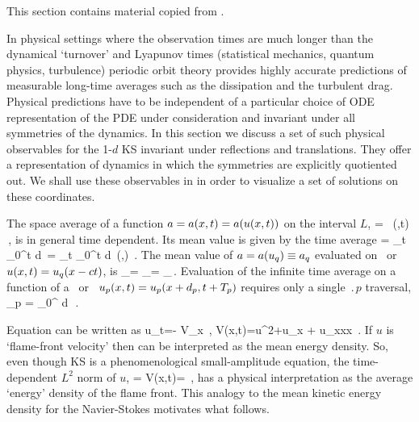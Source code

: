 \ifboyscout
This section contains material copied from .
\fi

In physical settings where the observation times are much
longer than the dynamical `turnover' and Lyapunov times
(statistical mechanics, quantum physics, turbulence) periodic
orbit theory provides highly accurate predictions
of measurable long-time averages such as the dissipation and
the turbulent drag. Physical predictions have to
be independent of a particular choice of ODE representation
of the PDE under consideration and
invariant under all symmetries of the dynamics. In this
section we discuss a set of such physical observables for the
1-$d$ KS invariant under reflections and translations. They
offer a representation of dynamics in which the symmetries
are explicitly quotiented out. We shall use these
observables in  in order to
visualize a set of solutions on these coordinates.

The {space average} of a function
$a = a(x,t) = a(u(x,t))$
on the interval $L$,
\beq
    \expct{\obser} = \Lint{\pSpace}\, \obser(\pSpace,t)
    \,,
    \label{rpo:spac_ave}
\eeq
is in general time dependent.
Its mean value is given by the {time average}
\beq
\timeAver{\obser}
    =
\lim_{t\rightarrow \infty}  \int_0^t \! d\tau \, \expct{\obser}
    =
\lim_{t\rightarrow \infty}  \int_0^t \!
    \Lint{\tau}  d\pSpace\, \obser(\pSpace,\tau)
    \,.
\label{rpo:tim_ave}
\eeq
The mean value of $a = a(u_q) \equiv a_q$ evaluated on
\eqv\ or {\reqv} $u(x,t) = u_q(x-ct)$,
is
\beq
\timeAver{\obser}_\stagn = \expct{\obser}_\stagn = \obser_\stagn\,.
\label{rpo:u-eqv} \eeq
Evaluation of the infinite time average
 on a function of a \po\ or \rpo\
$u_p(x,t)=u_p(x+d_p,t+{T_{p}})$ requires only a single
$\period{p}$ traversal,
\beq
  \timeAver{\obser}_p = 
    \int_0^{\period{p}} \! d\tau \, \expct{\obser}
\,.
\label{rpo:u-cyc}
\eeq

Equation  can be written as
\beq
    u_t=- V_x
        \,,\qquad
    V(x,t)={\textstyle{}}u^2+u_{x} + u_{xxx}
    \,.
If $u$ is `flame-front velocity' then
can be interpreted as the mean energy
density. So, even though KS is a phenomenological
small-amplitude equation, the time-dependent $L^2$ norm
of $u$,
\beq
    \expctE=
  \Lint{\pSpace}
  V(x,t)=
  \Lint{\pSpace} 
  \,,
  \label{ksEnergy}
\eeq
has a physical interpretation as the average `energy'
density of the flame front. This analogy to the mean kinetic energy
density for the Navier-Stokes motivates what follows.

